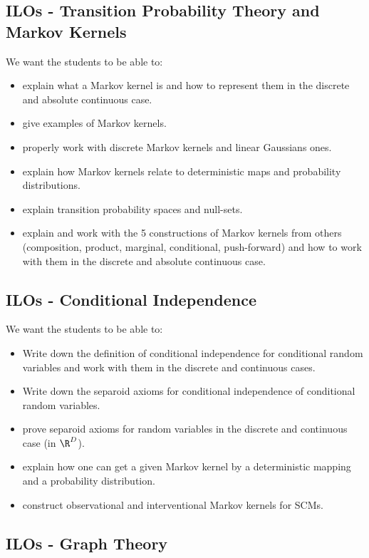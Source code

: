 \subsection*{ILOs - Transition Probability Theory and Markov Kernels}

We want the students to be able to:
\begin{itemize}
\item explain what a Markov kernel is and how to represent them in the discrete and absolute continuous case.
\item give examples of Markov kernels.
\item properly work with discrete Markov kernels and linear Gaussians ones.
\item explain how Markov kernels relate to deterministic maps and probability distributions.
\item explain transition probability spaces and null-sets.
\item explain and work with the 5 constructions of Markov kernels from others 
    (composition, product, marginal, conditional, push-forward) 
    and how to work with them in the discrete and absolute continuous case.
\end{itemize}


\subsection*{ILOs - Conditional Independence}

We want the students to be able to:
\begin{itemize}
\item Write down the definition of conditional independence for conditional random variables 
    and work with them in the discrete and continuous cases.
\item Write down the separoid axioms for conditional independence of conditional random variables.
\item prove separoid axioms for random variables in the discrete and continuous case (in $\R^D$).
\item explain how one can get a given Markov kernel by a deterministic mapping and a probability distribution.
\item construct observational and interventional Markov kernels for SCMs.
\end{itemize}


\subsection*{ILOs - Graph Theory}

